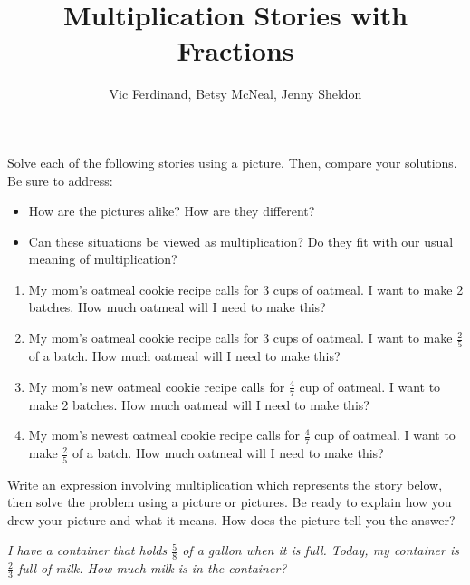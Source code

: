 \documentclass[nooutcomes,noauthor,handout]{ximera}
\title{Multiplication Stories with Fractions}
\author{Vic Ferdinand, Betsy McNeal, Jenny Sheldon}
\begin{document}
\begin{abstract} \end{abstract}
\maketitle




\begin{problem}
 Solve each of the following stories using a picture.  Then, compare your solutions.  Be sure to address:   
\begin{itemize}
    \item How are the pictures alike?  How are they different?
    \item Can these situations be viewed as multiplication?  Do they fit with our usual meaning of multiplication?
\end{itemize}

\begin{enumerate}%
    \item My mom's oatmeal cookie recipe calls for 3 cups of oatmeal.  
I want to make 2 batches.
How much oatmeal will I need to make this?
    \item My mom's oatmeal cookie recipe calls for 3 cups of oatmeal.  
I want to make $\frac{2}{5}$ of a batch.
How much oatmeal will I need to make this?
    \item My mom's new oatmeal cookie recipe calls for $\frac{4}{7}$ cup of oatmeal.  
I want to make 2 batches.
How much oatmeal will I need to make this?
    \item My mom's newest oatmeal cookie recipe calls for  $\frac{4}{7}$ cup of oatmeal.  
I want to make $\frac{2}{5}$ of a batch.
How much oatmeal will I need to make this?
\end{enumerate}

\end{problem}

\newpage




\begin{problem}
 Write an expression involving multiplication which represents the story below, then solve the problem using a picture or pictures.  Be ready to explain how you drew your picture and what it means.  How does the picture tell you the answer?

\emph{I have a container that holds $\frac{5}{8}$ of a gallon when it is full.  Today, my container is $\frac{2}{3}$ full of milk. How much milk is in the container?}
\end{problem}
\vfill
\end{document}
